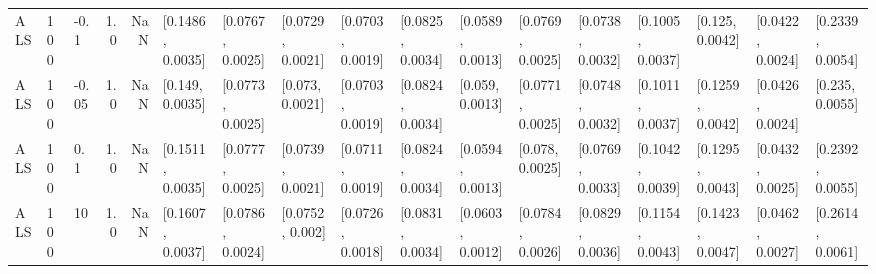 \begin{tabular}{lllrrllllllllllll}
       ALS &  100 &  -0.1 &   1.0 &   NaN &  [0.1486, 0.0035] &  [0.0767, 0.0025] &  [0.0729, 0.0021] &  [0.0703, 0.0019] &  [0.0825, 0.0034] &  [0.0589, 0.0013] &  [0.0769, 0.0025] &  [0.0738, 0.0032] &  [0.1005, 0.0037] &   [0.125, 0.0042] &  [0.0422, 0.0024] &  [0.2339, 0.0054] \\
       ALS &  100 & -0.05 &   1.0 &   NaN &   [0.149, 0.0035] &  [0.0773, 0.0025] &   [0.073, 0.0021] &  [0.0703, 0.0019] &  [0.0824, 0.0034] &   [0.059, 0.0013] &  [0.0771, 0.0025] &  [0.0748, 0.0032] &  [0.1011, 0.0037] &  [0.1259, 0.0042] &  [0.0426, 0.0024] &   [0.235, 0.0055] \\
       ALS &  100 &   0.1 &   1.0 &   NaN &  [0.1511, 0.0035] &  [0.0777, 0.0025] &  [0.0739, 0.0021] &  [0.0711, 0.0019] &  [0.0824, 0.0034] &  [0.0594, 0.0013] &   [0.078, 0.0025] &  [0.0769, 0.0033] &  [0.1042, 0.0039] &  [0.1295, 0.0043] &  [0.0432, 0.0025] &  [0.2392, 0.0055] \\
       ALS &  100 &    10 &   1.0 &   NaN &  [0.1607, 0.0037] &  [0.0786, 0.0024] &   [0.0752, 0.002] &  [0.0726, 0.0018] &  [0.0831, 0.0034] &  [0.0603, 0.0012] &  [0.0784, 0.0026] &  [0.0829, 0.0036] &  [0.1154, 0.0043] &  [0.1423, 0.0047] &  [0.0462, 0.0027] &  [0.2614, 0.0061] \\
\bottomrule
\end{tabular}
